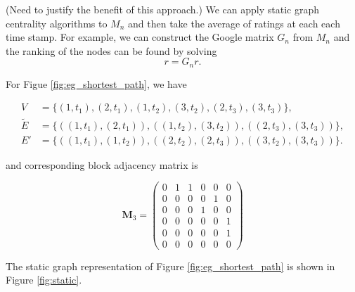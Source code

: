 \documentclass[12pt]{article}
\theoremstyle{definition}
\begin{document}
(Need to justify the benefit of this approach.)
We can apply static graph centrality algorithms to $M_n$ and then take the average of ratings at each each time stamp. For example, we can construct the Google matrix
$G_n$ from $M_n$ and the ranking of the nodes can be found by solving
$$
 r= G_n r.
$$

For Figue \ref{fig:eg_shortest_path}, we have

\begin{align*}
V & = \{(1,\!t_1), (2,\!t_1), (1,\!t_2), (3,\!t_2), (2,\!t_3), (3,\!t_3)\},\\
\tilde E &= \{((1,\!t_1), (2,\!t_1)), ((1,\!t_2), (3,\!t_2)), ((2,\!t_3), (3,\!t_3))\},\\
E'  &= \{((1,\!t_1), (1,\!t_2)), ((2,\!t_2), (2,\!t_3)), ((3,\!t_2), (3,\!t_3))\}.
\end{align*}

and corresponding block adjacency matrix is

\[
\bm M_3 = \begin{pmatrix}
0 & 1 & 1 & 0 & 0 & 0 \\
0 & 0 & 0 & 0 & 1 & 0 \\
0 & 0 & 0 & 1 & 0 & 0 \\
0 & 0 & 0 & 0 & 0 & 1 \\
0 & 0 & 0 & 0 & 0 & 1 \\
0 & 0 & 0 & 0 & 0 & 0
\end{pmatrix}
\]

The static graph representation of Figure \ref{fig:eg_shortest_path} is shown in Figure \ref{fig:static}.
\end{document}
